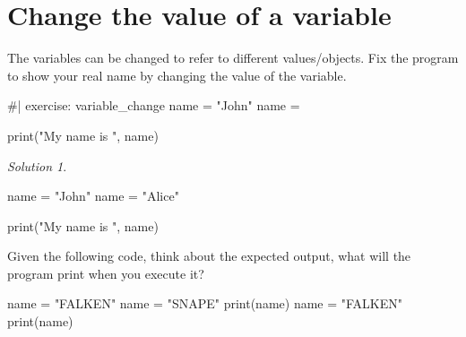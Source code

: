 \documentclass[
  letterpaper,
  DIV=11,
  numbers=noendperiod]{scrreprt}
\newenvironment{Shaded}{\begin{snugshade}}{\end{snugshade}}
\newcommand{\NormalTok}[1]{\textcolor[rgb]{0.00,0.23,0.31}{#1}}
\theoremstyle{remark}
\newtheorem*{solution}{Solution}
\begin{document}
\section{Change the value of a
variable}\label{change-the-value-of-a-variable}

The variables can be changed to refer to different values/objects. Fix
the program to show your real name by changing the value of the
variable.

\begin{Shaded}
\begin{Highlighting}[]
\NormalTok{\#| exercise: variable\_change}
\NormalTok{name = "John"}
\NormalTok{name = }

\NormalTok{print("My name is ", name)}
\end{Highlighting}
\end{Shaded}

\begin{solution}
\leavevmode

\begin{tcolorbox}[enhanced jigsaw, opacityback=0, colframe=quarto-callout-tip-color-frame, breakable, colback=white, colbacktitle=quarto-callout-tip-color!10!white, titlerule=0mm, left=2mm, toprule=.15mm, coltitle=black, opacitybacktitle=0.6, bottomrule=.15mm, arc=.35mm, leftrule=.75mm, bottomtitle=1mm, toptitle=1mm, rightrule=.15mm, title=\textcolor{quarto-callout-tip-color}{\faLightbulb}\hspace{0.5em}{Tip}]

\begin{Shaded}
\begin{Highlighting}[]
\NormalTok{name = "John"}
\NormalTok{name = "Alice"}

\NormalTok{print("My name is ", name)}
\end{Highlighting}
\end{Shaded}

\end{tcolorbox}

\end{solution}

Given the following code, think about the expected output, what will the
program print when you execute it?

\begin{Shaded}
\begin{Highlighting}[]
\NormalTok{name = "FALKEN"}
\NormalTok{name = "SNAPE"}
\NormalTok{print(name)}
\NormalTok{name = "FALKEN"}
\NormalTok{print(name)}
\end{Highlighting}
\end{Shaded}
\end{document}
